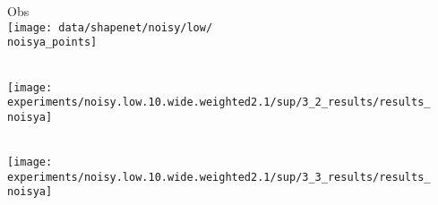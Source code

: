 {\footnotesize
\newcommand{\cleana}{231} %
\newcommand{\cleanb}{297}

\newcommand{\noisya}{132}
\newcommand{\noisyb}{66}

\newcommand{\bathtuba}{792}
\newcommand{\bathtubb}{330}

\newcommand{\chaira}{528}
\newcommand{\chairb}{990} %

\newcommand{\deska}{264} %
\newcommand{\deskb}{858}

\newcommand{\tablea}{858}
\newcommand{\tableb}{396} %

\hspace*{-6px}
\begin{minipage}[t]{0.02\textwidth}
    \vspace{0px}\centering
    \vspace{4.5mm}
\end{minipage}
\begin{minipage}[t]{0.10\textwidth}
   	\vspace{0px}\centering
   	\hspace*{3mm}
    Obs\\[-1px]
   	\texttt{[image: data/shapenet/noisy/low/\\noisya\_points]}
\end{minipage}
\begin{minipage}[t]{0.10\textwidth}
   	\vspace{0px}\centering
   	\hspace*{3mm}
    \cite{Dai2017CVPRa}\\[-1px]
   	\texttt{[image: experiments/noisy.low.10.wide.weighted2.1/sup/3\_2\_results/results\_\\noisya]}
\end{minipage}
\begin{minipage}[t]{0.10\textwidth}
    \vspace{0px}\centering
    \hspace*{3mm}
    \cite{Dai2017CVPRa}\\[-1px]
    \texttt{[image: experiments/noisy.low.10.wide.weighted2.1/sup/3\_3\_results/results\_\\noisya]}
\end{minipage}
\begin{minipage}[t]{0.10\textwidth}
   	\vspace{0px}\centering
   	\hspace*{3mm}

\end{minipage}}
